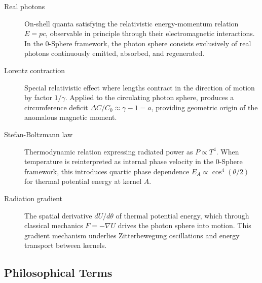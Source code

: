 \documentclass[12pt,letterpaper]{article}
\begin{document}
\begin{description}
\item[Real photons] On-shell quanta satisfying the relativistic energy-momentum relation $E = pc$, observable in principle through their electromagnetic interactions. In the 0-Sphere framework, the photon sphere consists exclusively of real photons continuously emitted, absorbed, and regenerated.

\item[Lorentz contraction] Special relativistic effect where lengths contract in the direction of motion by factor $1/\gamma$. Applied to the circulating photon sphere, produces a circumference deficit $\Delta C/C_0 \approx \gamma - 1 = a$, providing geometric origin of the anomalous magnetic moment.

\item[Stefan-Boltzmann law] Thermodynamic relation expressing radiated power as $P \propto T^4$. When temperature is reinterpreted as internal phase velocity in the 0-Sphere framework, this introduces quartic phase dependence $E_A \propto \cos^4(\theta/2)$ for thermal potential energy at kernel $A$.

\item[Radiation gradient] The spatial derivative $dU/d\theta$ of thermal potential energy, which through classical mechanics $F = -\nabla U$ drives the photon sphere into motion. This gradient mechanism underlies Zitterbewegung oscillations and energy transport between kernels.

\end{description}

\subsection*{Philosophical Terms}
\end{document}
